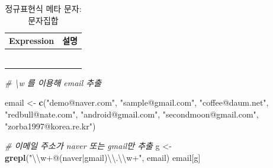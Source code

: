 \documentclass[
  11pt,
]{krantz}
\newenvironment{Shaded}{\begin{snugshade}}{\end{snugshade}}
\newcommand{\CharTok}[1]{\textcolor[rgb]{0.5,0.5,0.5}{#1}}
\newcommand{\CommentTok}[1]{\textcolor[rgb]{0.37,0.37,0.37}{\textit{#1}}}
\newcommand{\KeywordTok}[1]{\textcolor[rgb]{0.27,0.27,0.27}{\textbf{#1}}}
\newcommand{\NormalTok}[1]{#1}
\newcommand{\StringTok}[1]{\textcolor[rgb]{0.5,0.5,0.5}{#1}}
\begin{document}
\begin{table}[H]

\caption{\label{tab:meta-char2}정규표현식 메타 문자: 문자집합}
\centering
\fontsize{10}{12}\selectfont
\begin{tabu} to 
\toprule
Expression & 설명\\
\midrule
{}   & \\
 & \\
   & \\
 & \\
   & \\
\addlinespace
{} & \\
\bottomrule
\end{tabu}
\end{table}

\normalsize

\footnotesize

\begin{Shaded}
\begin{Highlighting}[]
\CommentTok{# \textbackslash{}w 를 이용해 email 추출}

\NormalTok{email <-}\StringTok{ }\KeywordTok{c}\NormalTok{(}\StringTok{"demo@naver.com"}\NormalTok{, }
           \StringTok{"sample@gmail.com"}\NormalTok{, }
           \StringTok{"coffee@daum.net"}\NormalTok{, }
           \StringTok{"redbull@nate.com"}\NormalTok{, }
           \StringTok{"android@gmail.com"}\NormalTok{, }
           \StringTok{"secondmoon@gmail.com"}\NormalTok{, }
           \StringTok{"zorba1997@korea.re.kr"}\NormalTok{)}

\CommentTok{# 이메일 주소가 naver 또는 gmail만 추출}
\NormalTok{g <-}\StringTok{ }\KeywordTok{grepl}\NormalTok{(}\StringTok{"}\CharTok{\textbackslash{}\textbackslash{}}\StringTok{w+@(naver|gmail)}\CharTok{\textbackslash{}\textbackslash{}}\StringTok{.}\CharTok{\textbackslash{}\textbackslash{}}\StringTok{w+"}\NormalTok{, email)}
\NormalTok{email[g]}
\end{Highlighting}
\end{Shaded}
\end{document}
